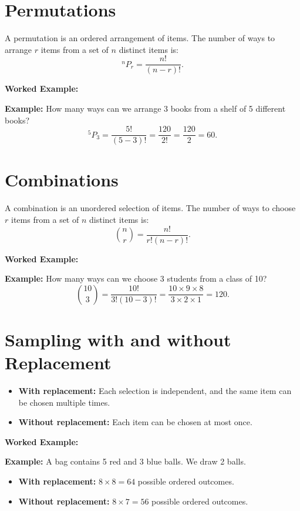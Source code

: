 \documentclass[12pt,a4paper,oneside]{report}
\theoremstyle{mytheorem}
\theoremstyle{mydefinition}
\theoremstyle{myremark}
\newenvironment{worked}{%
  \par\medskip\noindent\textbf{\color{myorange}Worked Example:}\par\smallskip
}{%
  \par\medskip
}
\begin{document}
\section{Permutations}
A permutation is an ordered arrangement of items. The number of ways to arrange $r$ items from a set of $n$ distinct items is:
\[
{}^nP_r = \frac{n!}{(n-r)!}.
\]

\begin{worked}
\textbf{Example:}
How many ways can we arrange 3 books from a shelf of 5 different books?
\[
{}^5P_3 = \frac{5!}{(5-3)!} = \frac{120}{2!} = \frac{120}{2} = 60.
\]
\end{worked}

\section{Combinations}
A combination is an unordered selection of items. The number of ways to choose $r$ items from a set of $n$ distinct items is:
\[
\binom{n}{r} = \frac{n!}{r!(n-r)!}.
\]

\begin{worked}
\textbf{Example:}
How many ways can we choose 3 students from a class of 10?
\[
\binom{10}{3} = \frac{10!}{3!(10-3)!} = \frac{10 \times 9 \times 8}{3 \times 2 \times 1} = 120.
\]
\end{worked}

\section{Sampling with and without Replacement}
\begin{itemize}
    \item \textbf{With replacement:} Each selection is independent, and the same item can be chosen multiple times.
    \item \textbf{Without replacement:} Each item can be chosen at most once.
\end{itemize}

\begin{worked}
\textbf{Example:}
A bag contains 5 red and 3 blue balls. We draw 2 balls.
\begin{itemize}
    \item \textbf{With replacement:} $8 \times 8 = 64$ possible ordered outcomes.
    \item \textbf{Without replacement:} $8 \times 7 = 56$ possible ordered outcomes.
\end{itemize}
\end{worked}
\end{document}

